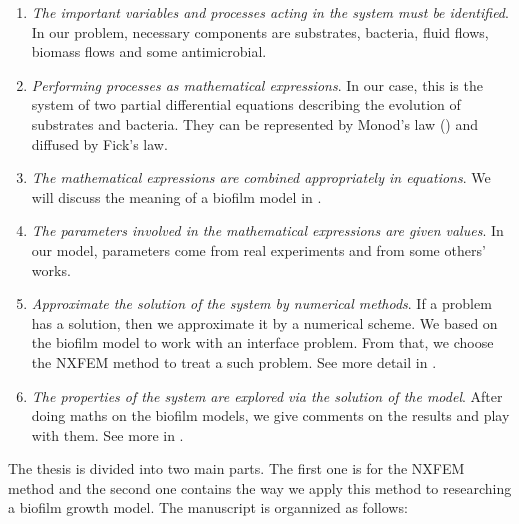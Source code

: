\documentclass[../main.tex]{subfiles}
\begin{document}
\begin{enumerate}
  \item \textit{The important variables and processes acting in the system must be identified}. In our problem, necessary components are substrates, bacteria, fluid flows, biomass flows and some antimicrobial.
  \item \textit{Performing processes as mathematical expressions}. In our case, this is the system of two partial differential equations describing the evolution of substrates and bacteria. They can be represented by Monod's law () and diffused by Fick's law.
  \item \textit{The mathematical expressions are combined appropriately in equations}. We will discuss the meaning of a biofilm model in .
  \item \textit{The parameters involved in the mathematical expressions are given values}. In our model, parameters  come from real experiments and from some others' works.
  \item \textit{Approximate the solution of the system by numerical methods}. If a problem has a solution, then we approximate it by a numerical scheme. We based on the biofilm model to work with an interface problem. From that, we choose the NXFEM method to treat a such problem. See more detail in . 
  \item \textit{The properties of the system are explored via the solution of the model}. After doing maths on the biofilm models, we give comments on the results and play with them. See more in .
\end{enumerate}

The thesis is divided into two main parts. The first one is for the NXFEM method and the second one contains the way we apply this method to researching a biofilm growth model. The manuscript is organnized as follows:
\end{document}
